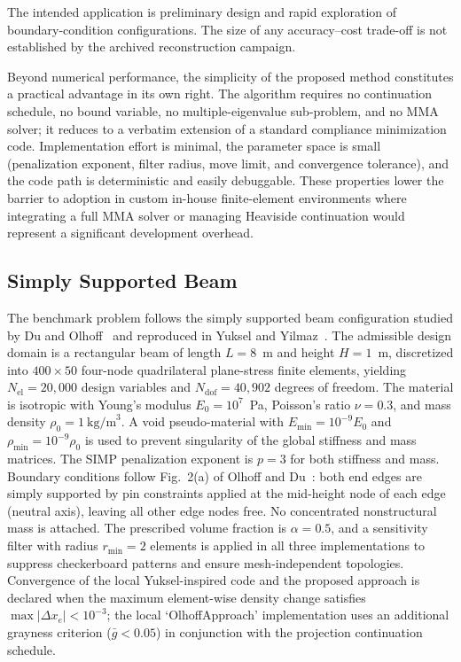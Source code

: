The intended application is preliminary design and rapid exploration of
boundary-condition configurations. The size of any accuracy--cost trade-off is
not established by the archived reconstruction campaign.

Beyond numerical performance, the simplicity of the proposed method
constitutes a practical advantage in its own right.  The algorithm requires
no continuation schedule, no bound variable, no multiple-eigenvalue
sub-problem, and no MMA solver; it reduces to a verbatim extension of a
standard compliance minimization code.  Implementation effort is minimal, the
parameter space is small (penalization exponent, filter radius, move limit,
and convergence tolerance), and the code path is deterministic and easily
debuggable.  These properties lower the barrier to adoption in custom
in-house finite-element environments where integrating a full MMA solver or
managing Heaviside continuation would represent a significant development
overhead.

\subsection{Simply Supported Beam}

The benchmark problem follows the simply supported beam configuration studied by
Du and Olhoff~\cite{Du2007} and reproduced in Yuksel and
Yilmaz~\cite{Yuksel2025}.  The admissible design domain is a rectangular
beam of length $L = 8$~m and height $H = 1$~m, discretized into $400 \times 50$
four-node quadrilateral plane-stress finite elements, yielding $N_\mathrm{el} =
20{,}000$ design variables and $N_\mathrm{dof} = 40{,}902$ degrees of freedom.
The material is isotropic with Young's modulus $E_0 = 10^7$~Pa, Poisson's ratio
$\nu = 0.3$, and mass density $\rho_0 = 1~\mathrm{kg/m}^3$.  A void
pseudo-material with $E_\mathrm{min} = 10^{-9}E_0$ and $\rho_\mathrm{min} =
10^{-9}\rho_0$ is used to prevent singularity of the global stiffness and mass
matrices.  The SIMP penalization exponent is $p = 3$ for both stiffness and
mass.  Boundary conditions follow Fig.~2(a) of Olhoff and
Du~\cite{Du2007}: both end edges are simply supported by pin constraints
applied at the mid-height node of each edge (neutral axis), leaving all other
edge nodes free.  No concentrated nonstructural mass is attached.  The
prescribed volume fraction is $\alpha = 0.5$, and a sensitivity filter with
radius $r_\mathrm{min} = 2$ elements is applied in all three implementations to
suppress checkerboard patterns and ensure mesh-independent topologies.
Convergence of the local Yuksel-inspired code and the proposed approach is declared
when the maximum element-wise density change satisfies $\max|\Delta x_e| <
10^{-3}$; the local `OlhoffApproach' implementation uses an additional grayness criterion
($\bar{g} < 0.05$) in conjunction with the projection continuation schedule.


